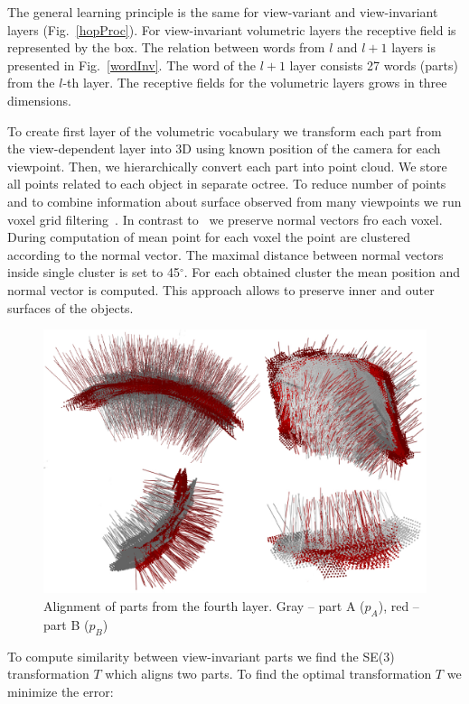 \documentclass[letterpaper,10pt,conference]{ieeeconf}  %
\begin{document}
The general learning principle is the same for view-variant and view-invariant layers (Fig.~\ref{hopProc}). For view-invariant volumetric layers the receptive field is represented by the box. The relation between words from $l$ and $l+1$ layers is presented in Fig.~\ref{wordInv}. The word of the $l+1$ layer consists 27 words (parts) from the $l$-th layer. The receptive fields for the volumetric layers grows in three dimensions.

To create first layer of the volumetric vocabulary we transform each part from the view-dependent layer into 3D using known position of the camera for each viewpoint. Then, we hierarchically convert each part into point cloud. We store all points related to each object in separate octree. To reduce number of points and to combine information about surface observed from many viewpoints we run voxel grid filtering~\cite{Aldoma2012}. In contrast to~\cite{Aldoma2012} we preserve normal vectors fro each voxel. During computation of mean point for each voxel the point are clustered according to the normal vector. The maximal distance between normal vectors inside single cluster is set to 45$^\circ$. For each obtained cluster the mean position and normal vector is computed. This approach allows to preserve inner and outer surfaces of the objects.

\begin{figure}[t]
 \centering
\includegraphics[width=0.95\columnwidth]{../images/viParts.eps}
\caption{Alignment of parts from the fourth layer. Gray -- part A ($p_A$), red -- part B ($p_B$)}
 \label{viParts}
\end{figure}

To compute similarity between view-invariant parts we find the SE(3) transformation $T$ which aligns two parts. To find the optimal transformation $T$ we minimize the error:
\end{document}

